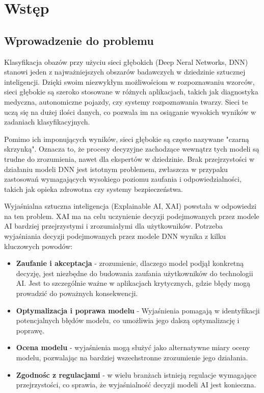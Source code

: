 
\chapter*{Wstęp}

\section*{Wprowadzenie do problemu}
Klasyfikacja obazów przy użyciu sieci głębokich (Deep Neral Networks, DNN) stanowi jeden z najważniejszych obszarów badawczych w dziedzinie sztucznej inteligencji.
Dzięki swoim niezwykłym możliwościom w rozpoznawaniu wzorców, sieci głębokie są szeroko stosowane w różnych aplikacjach, takich jak diagnostyka medyczna, autonomiczne pojazdy, czy systemy rozpoznawania twarzy.
Sieci te uczą się na dużej ilości danych, co pozwala im na osiąganie wysokich wyników w zadaniach klasyfikacyjnych.

Pomimo ich imponujących wyników, sieci głębokie są często nazywane "czarną skrzynką".
Oznacza to, że procesy decyzyjne zachodzące wewnątrz tych modeli są trudne do zrozumienia, nawet dla ekspertów w dziedzinie.
Brak przejrzystości w działaniu modeli DNN jest istotnym problemem, zwłaszcza w przypaku zastosowań wymagających wysokiego poziomu zaufania i odpowiedzialności, takich jak opieka zdrowotna czy systemy bezpieczeństwa.

Wyjaśnialna sztuczna inteligencja (Explainable AI, XAI) powstała w odpowiedzi na ten problem.
XAI ma na celu uczynienie decyzji podejmowanych przez modele AI bardziej przejrzystymi i zrozumiałymi dla użytkowników.
Potrzeba wyjaśniania decyzji podejmowanych przez modele DNN wynika z kilku kluczowych powodów:
\begin{itemize}
	\item \textbf{Zaufanie i akceptacja} - zrozumienie, dlaczego model podjął konkretną decyzję, jest niezbędne do budowania zaufania użytkowników do technologii AI.
	      Jest to szczególnie ważne w aplikacjach krytycznych, gdzie błędy mogą prowadzić do poważnych konsekwencji.
	\item \textbf{Optymalizacja i poprawa modelu} - Wyjaśnienia pomagają w identyfikacji potencjalnych błędów modelu, co umożliwia jego dalszą optymalizację i poprawę.
	\item \textbf{Ocena modelu} - wyjaśnienia mogą służyć jako alternatywne miary oceny modelu, pozwalając na bardziej wszechstronne zrozumienie jego działania.
	\item \textbf{Zgodnośc z regulacjami} - w wielu branżach istnieją regulacje wymagające przejrzystości, co sprawia, że wyjaśnialność decyzji modeli AI jest konieczna.
\end{itemize}

